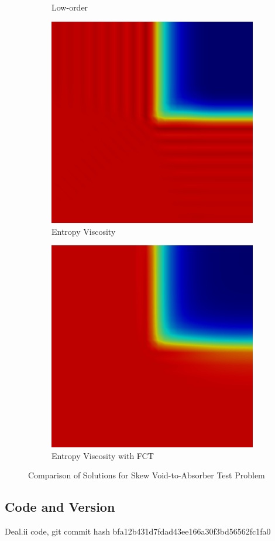\begin{figure}[ht]
\begin{subfigure}{0.3\textwidth}
      \caption{Low-order}
   \end{subfigure}
   \begin{subfigure}{0.3\textwidth}
      \includegraphics[width=\textwidth]{skew_void_to_absorber/EV.png}
      \caption{Entropy Viscosity}
   \end{subfigure}
   \begin{subfigure}{0.3\textwidth}
      \includegraphics[width=\textwidth]{skew_void_to_absorber/EVFCT.png}
      \caption{Entropy Viscosity with FCT}
   \end{subfigure}
   \caption{Comparison of Solutions for Skew Void-to-Absorber Test Problem}
   \label{fig:skew_void_to_absorber_2D}
\end{figure}
\subsection{Code and Version}
Deal.ii code, git commit hash bfa12b431d7fdad43ee166a30f3bd56562fc1fa0
